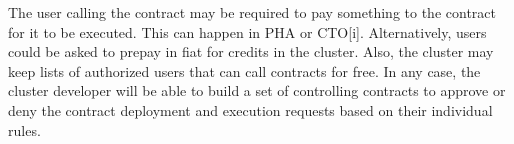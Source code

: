 \documentclass[11pt, a4paper, twocolumn]{article}
\begin{document}
The user calling the contract may be required to pay something to the contract for it to be executed. This can happen in PHA or CTO[i]. Alternatively, users could be asked to prepay in fiat for credits in the cluster. Also, the cluster may keep lists of authorized users that can call contracts for free. In any case, the cluster developer will be able to build a set of controlling contracts to approve or deny the contract deployment and execution requests based on their individual rules.

%
%	


%
%
%

\end{document}
